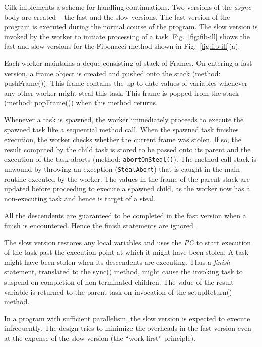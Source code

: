 Cilk implements a scheme for handling continuations.  Two versions of
the \emph{async} body are created -- the fast and the slow
versions. The fast version of the program is executed during the
normal course of the program. The slow version is invoked by the
worker to initiate processing of a task. Fig.~\ref{fig:fib-ill} shows
the fast and slow versions for the Fibonacci method shown in
Fig.~\ref{fig:fib-ill}(a).

Each worker maintains a deque consisting of stack of Frames. On
entering a fast version, a frame object is created and pushed onto the
stack (method: {\java pushFrame()}). This frame contains the
up-to-date values of variables whenever any other worker might steal
this task. This frame is popped from the stack (method: {\java popFrame()}) 
when this method returns.

Whenever a task is spawned, the worker immediately proceeds to execute
the spawned task like a sequential method call. When the spawned task
finishes execution, the worker checks whether the current frame was
stolen. If so, the result computed by the child task is stored to be
passed onto its parent and the execution of the task aborts (method:
{\tt abortOnSteal()}). The method call stack is unwound by throwing
an exception ({\tt StealAbort}) that is caught in the main
routine executed by the worker. The values in the frame of the parent
stack are updated before proceeding to execute a spawned child, as the
worker now has a non-executing task and hence is target of a steal. 

All the descendents are guaranteed to be completed in the fast version
when a {\java finish} is encountered. Hence the finish statements
are ignored.

The slow version restores any local variables and uses the {\em PC} to
start execution of the task past the execution point at which it might
have been stolen. A task might have been stolen when its descendents
are executing. Thus a {\em finish} statement, translated to the
{\java sync()} method, might cause the invoking task to suspend on
completion of non-terminated children. The value of the {\java result} 
variable is returned to the parent task on invocation of the
{\java setupReturn()} method. 

In a program with sufficient parallelism, the slow version is expected
to execute infrequently. The design tries to minimize the overheads in
the fast version even at the expense of the slow version (the
``work-first'' principle).

